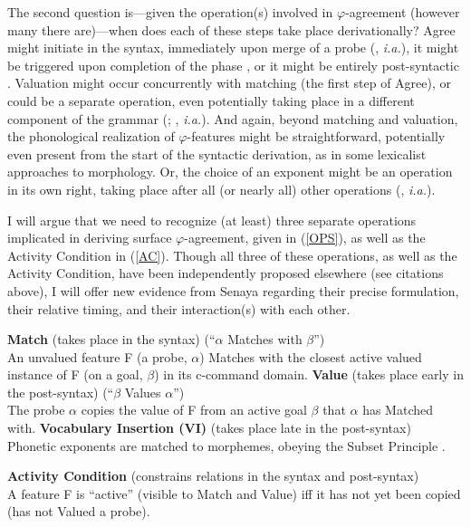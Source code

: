 \documentclass[output=paper
,modfonts
,nonflat]{langsci/langscibook}
\begin{document}
The second question is---given the operation(s) involved in $\varphi$-agreement (however many there are)---when does each of these steps take place derivationally? Agree might initiate in the syntax, immediately upon merge of a probe ({\citealt{Bejar03,Preminger11,Preminger14}, \textit{i.a.}}), it might be triggered upon completion of the phase \citep{Chomsky08}, or it might be entirely post-syntactic \citep{Bobaljik08}. Valuation might occur concurrently with matching (the first step of Agree), or could be a separate operation, even potentially taking place in a different component of the grammar (\citealt{vanKoppen07,BBP09,ArregiNevins12,BhattWalkow13,Bonet13,Marusicetal15,Smith17,AtlamazBakerTA}; , \textit{i.a.}). And again, beyond matching and valuation, the phonological realization of $\varphi$-features  might be straightforward, potentially even present from the start of the syntactic derivation, as in some lexicalist approaches to morphology. Or, the choice of an exponent might be an operation in its own right,  taking place after all (or nearly all) other operations  (\citealt{HalleMarantz93,HalleMarantz94,EmbickNoyer07}, \textit{i.a.}). 

I will argue that we need to recognize (at least) three separate operations implicated in deriving surface $\varphi$-agreement, given in (\ref{OPS}), as well as the Activity Condition in (\ref{AC}). Though all three of these operations, as well as the Activity Condition, have been independently proposed elsewhere (see citations above), I will offer new evidence from Senaya regarding their precise formulation, their relative timing, and their interaction(s) with each other.

\eal \label{OPS}
\ex \textbf{Match} {(takes place in the syntax)} \- \hfill (``{$\alpha$} Matches with {$\beta$}'')\\
An unvalued feature F (a probe, {$\alpha$}) Matches with the closest active valued instance of F (on a goal, {$\beta$}) in its c-command domain.
\ex \textbf{Value} (takes place early in the post-syntax) \- \hfill (``{$\beta$} Values {$\alpha$}'')\\
The probe {$\alpha$} copies the value of F from an active goal {$\beta$} that {$\alpha$} has Matched with.
\ex \textbf{Vocabulary Insertion (VI)} (takes place late in the post-syntax)\\
Phonetic exponents are matched to morphemes, obeying the Subset Principle \citep{Halle97}.
\zl

\ea \textbf{Activity Condition} (constrains relations in the syntax and post-syntax)\\A feature F is ``active'' (visible to Match and Value) iff it has not yet been copied (has not Valued a probe).\label{AC}
\z
\end{document}
